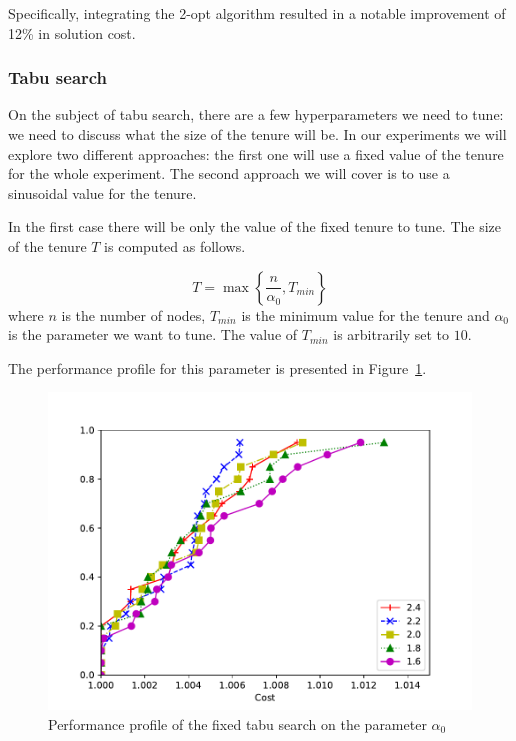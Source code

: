 \documentclass{article}
\begin{document}
Specifically, integrating the 2-opt algorithm resulted in a notable improvement of 12\% in solution cost.

\clearpage

\subsubsection{Tabu search}
On the subject of tabu search, there are a few hyperparameters we need to tune:
we need to discuss what the size of the tenure will be. In our
experiments we will explore two different approaches: the first one will use
a fixed value of the tenure for the whole experiment. The second approach we
will cover is to use a sinusoidal value for the tenure.

In the first case there will be only the value of the fixed tenure to tune.
The size of the tenure $T$ is computed as follows.

\begin{equation*}
        T = \max \left\{
                \frac{n}{\alpha_0} ,
                T_{min}
        \right\}
\end{equation*}
where $n$ is the number of nodes, $T_{min}$ is the minimum value for the tenure
and $\alpha_0$ is the parameter we want to tune. The value of $T_{min}$ is arbitrarily
set to $10$.

The performance profile for this parameter is presented in Figure~\ref{fig:ht_fixten}.

\begin{figure}[ht]
        \caption{Performance profile of the fixed tabu search on the parameter $\alpha_0$}
        \label{fig:ht_fixten}
        \centering
        \includegraphics[width=340pt]{assets/ht_fixten.pdf}
\end{figure}
\end{document}

